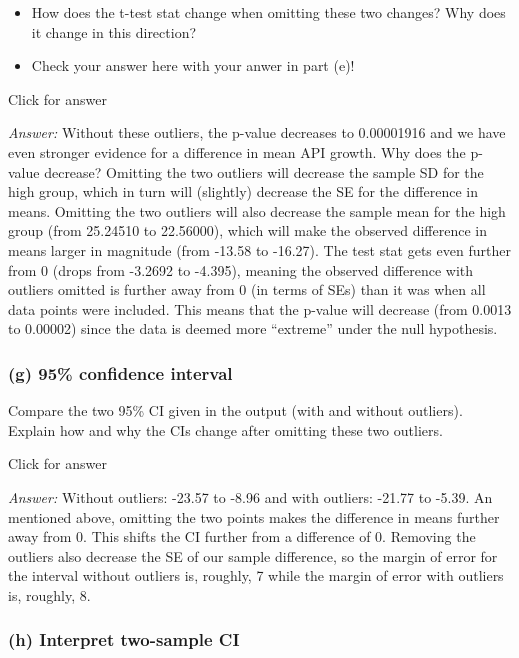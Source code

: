 \documentclass[
]{book}
\providecommand{\tightlist}{%
  \setlength{\itemsep}{0pt}\setlength{\parskip}{0pt}}
\begin{document}
\begin{itemize}
\tightlist
\item
  How does the t-test stat change when omitting these two changes? Why does it change in this direction?
\item
  Check your answer here with your anwer in part (e)!
\end{itemize}

Click for answer

\emph{Answer:} Without these outliers, the p-value decreases to 0.00001916 and we have even stronger evidence for a difference in mean API growth. Why does the p-value decrease? Omitting the two outliers will decrease the sample SD for the high group, which in turn will (slightly) decrease the SE for the difference in means. Omitting the two outliers will also decrease the sample mean for the high group (from 25.24510 to 22.56000), which will make the observed difference in means larger in magnitude (from -13.58 to -16.27). The test stat gets even further from 0 (drops from -3.2692 to -4.395), meaning the observed difference with outliers omitted is further away from 0 (in terms of SEs) than it was when all data points were included. This means that the p-value will decrease (from 0.0013 to 0.00002) since the data is deemed more ``extreme'' under the null hypothesis.

\hypertarget{g-95-confidence-interval-1}{%
\subsubsection{(g) 95\% confidence interval}\label{g-95-confidence-interval-1}}

Compare the two 95\% CI given in the output (with and without outliers). Explain how and why the CIs change after omitting these two outliers.

Click for answer

\emph{Answer:} Without outliers: -23.57 to -8.96 and with outliers: -21.77 to -5.39. An mentioned above, omitting the two points makes the difference in means further away from 0. This shifts the CI further from a difference of 0. Removing the outliers also decrease the SE of our sample difference, so the margin of error for the interval without outliers is, roughly, 7 while the margin of error with outliers is, roughly, 8.

\hypertarget{h-interpret-two-sample-ci-1}{%
\subsubsection{(h) Interpret two-sample CI}\label{h-interpret-two-sample-ci-1}}
\end{document}
